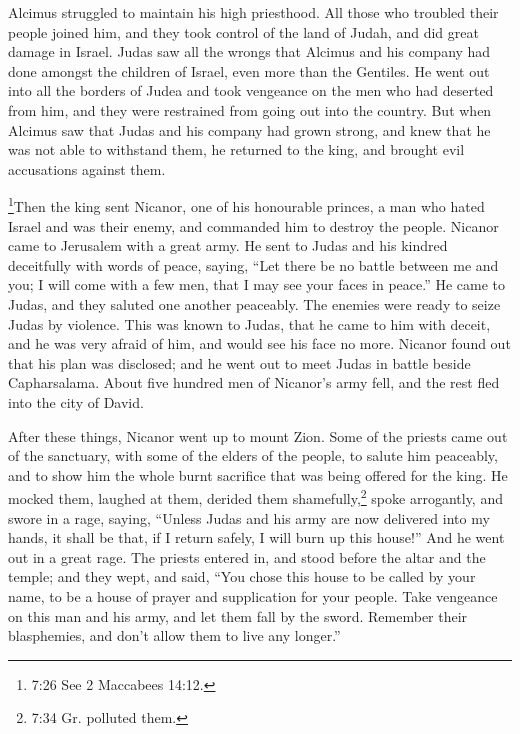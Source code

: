 Alcimus struggled to maintain his high priesthood.
 All those who troubled their people joined him, and they
took control of the land of Judah, and did great damage in Israel.
 Judas saw all the wrongs that Alcimus and his company had
done amongst the children of Israel, even more than the Gentiles.
 He went out into all the borders of Judea and took
vengeance on the men who had deserted from him, and they were restrained
from going out into the country.  But when Alcimus saw that
Judas and his company had grown strong, and knew that he was not able to
withstand them, he returned to the king, and brought evil accusations
against them.

 \footnote{7:26 See 2 Maccabees 14:12.}Then the king sent
Nicanor, one of his honourable princes, a man who hated Israel and was
their enemy, and commanded him to destroy the people. 
Nicanor came to Jerusalem with a great army. He sent to Judas and his
kindred deceitfully with words of peace, saying,  ``Let
there be no battle between me and you; I will come with a few men, that
I may see your faces in peace.''  He came to Judas, and
they saluted one another peaceably. The enemies were ready to seize
Judas by violence.  This was known to Judas, that he came
to him with deceit, and he was very afraid of him, and would see his
face no more.  Nicanor found out that his plan was
disclosed; and he went out to meet Judas in battle beside Capharsalama.
 About five hundred men of Nicanor's army fell, and the
rest fled into the city of David.

 After these things, Nicanor went up to mount Zion. Some of
the priests came out of the sanctuary, with some of the elders of the
people, to salute him peaceably, and to show him the whole burnt
sacrifice that was being offered for the king.  He mocked
them, laughed at them, derided them shamefully,\footnote{7:34 Gr.
  polluted them.} spoke arrogantly,  and swore in a rage,
saying, ``Unless Judas and his army are now delivered into my hands, it
shall be that, if I return safely, I will burn up this house!'' And he
went out in a great rage.  The priests entered in, and
stood before the altar and the temple; and they wept, and said,
 ``You chose this house to be called by your name, to be a
house of prayer and supplication for your people.  Take
vengeance on this man and his army, and let them fall by the sword.
Remember their blasphemies, and don't allow them to live any longer.''

